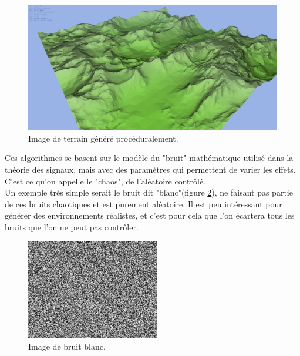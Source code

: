 \documentclass[a4paper]{article}
\begin{document}
    \begin{figure}[!h]
        \begin{center} \includegraphics[width=0.8\linewidth]{img/landscape.jpg} \end{center}
        \caption{\label{figure5}Image de terrain généré procéduralement\protect\footnotemark .}
    \end{figure}
            
        
    Ces algorithmes se basent sur le modèle du "bruit" mathématique utilisé dans la théorie des signaux, mais avec des paramètres qui permettent de varier les effets. C'est ce qu'on appelle le "chaos", de l'aléatoire contrôlé.\\
    Un exemple très simple serait le bruit dit "blanc"(figure \ref{whitenoise}), ne faisant pas partie de ces bruits chaotiques et est purement aléatoire. Il est peu intéressant pour générer des environnements réalistes, et c'est pour cela que l'on écartera tous les bruits que l'on ne peut pas contrôler.\\
    
        \begin{figure}[!h]
        \begin{center} \includegraphics[width=0.4\linewidth]{img/noise/whitenoise.png} \end{center}
        \caption{\label{whitenoise}Image de bruit blanc\protect\footnotemark .}
        \end{figure}
            
\end{document}

